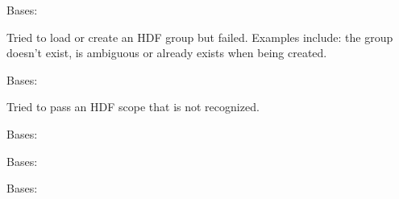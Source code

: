 \documentclass[letterpaper,10pt,english]{sphinxmanual}
\begin{document}

\begin{fulllineitems}
\label{\detokenize{xanespy:xanespy.exceptions.GroupKeyError}}
Bases: 

Tried to load or create an HDF group but failed. Examples include:
the group doesn’t exist, is ambiguous or already exists when being
created.

\end{fulllineitems}


\begin{fulllineitems}
\label{\detokenize{xanespy:xanespy.exceptions.HDFScopeError}}
Bases: 

Tried to pass an HDF scope that is not recognized.

\end{fulllineitems}


\begin{fulllineitems}
\label{\detokenize{xanespy:xanespy.exceptions.NoParticleError}}
Bases: 

\end{fulllineitems}


\begin{fulllineitems}
\label{\detokenize{xanespy:xanespy.exceptions.RefinementError}}
Bases: 

\end{fulllineitems}


\begin{fulllineitems}
\label{\detokenize{xanespy:xanespy.exceptions.XanesMathError}}
Bases: 

\end{fulllineitems}
\end{document}
